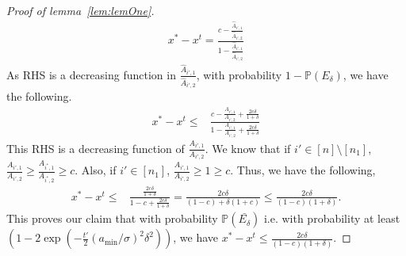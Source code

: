 \begin{proof}[Proof of lemma~\ref{lem:lemOne}]
\begin{align*}
x^* - x^t = \frac{c - \frac{\widehat{A}_{i',1}}{\widehat{A}_{i',2}}}{1 - \frac{\widehat{A}_{i',1}}{\widehat{A}_{i',2}}}
\end{align*}
As RHS is a decreasing function in $\frac{\widehat{A}_{i', 1}}{\widehat{A}_{i', 2}}$, with probability $1-\mathbb{P}(E_\delta)$, we have the following.
\begin{align*}
    x^*-x^t\leq & \frac{c-\frac{A_{i', 1}}{A_{i', 2}}+\frac{2c\delta}{1+\delta}}{1-\frac{A_{i', 1}}{A_{i', 2}}+\frac{2c\delta}{1+\delta}}
\end{align*}
This RHS is a decreasing function of $\frac{A_{i', 1}}{A_{i', 2}}$. We know that if $i'\in [n]\setminus [n_1]$, $\frac{A_{i', 1}}{A_{i', 2}}\geq \frac{A_{i^*, 1}}{A_{i^*, 2}}\geq c$. Also, if $i'\in [n_1]$, $\frac{A_{i', 1}}{A_{i', 2}}\geq 1\geq c$. Thus, we have the following,
\begin{align*}
    x^*-x^t\leq & \frac{\frac{2c\delta}{1+\delta}}{1-c+\frac{2c\delta}{1+\delta}}=\frac{2c\delta}{(1-c)+\delta(1+c)} \leq \frac{2c\delta}{(1-c)(1+\delta)}.
\end{align*}
This proves our claim that with probability $\mathbb{P}(\bar{E_\delta})$ i.e. with probability at least $\left(1-2\exp\left( -\frac{t'}{2}\left(a_{\min}/\sigma\right)^2\delta^2 \right)\right)$, we have $x^*-x^t\leq \frac{2c\delta}{(1-c)(1+\delta)}.$

\end{proof}